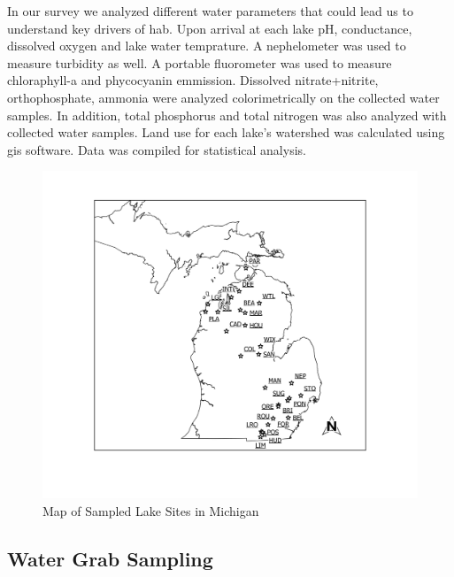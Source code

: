 In our survey we analyzed different water parameters that could lead us to understand key drivers of \gls{hab}. Upon arrival at each lake pH, conductance, dissolved oxygen and lake water temprature. A nephelometer was used to measure turbidity as well. A portable fluorometer was used to measure chloraphyll-a and phycocyanin emmission. Dissolved nitrate+nitrite, orthophosphate, ammonia were analyzed colorimetrically on the collected water samples. In addition, total phosphorus and total nitrogen was also analyzed with collected water samples. Land use for each lake's watershed was calculated using \gls{gis} software. Data was compiled for statistical analysis.

\begin{figure}[!h]
\includegraphics[width=\textwidth]{figures/Overview}
\caption{Map of Sampled Lake Sites in Michigan}
\label{fig:overview}
\end{figure}

\clearpage
\subsection{Water Grab Sampling} \label{sampling}

